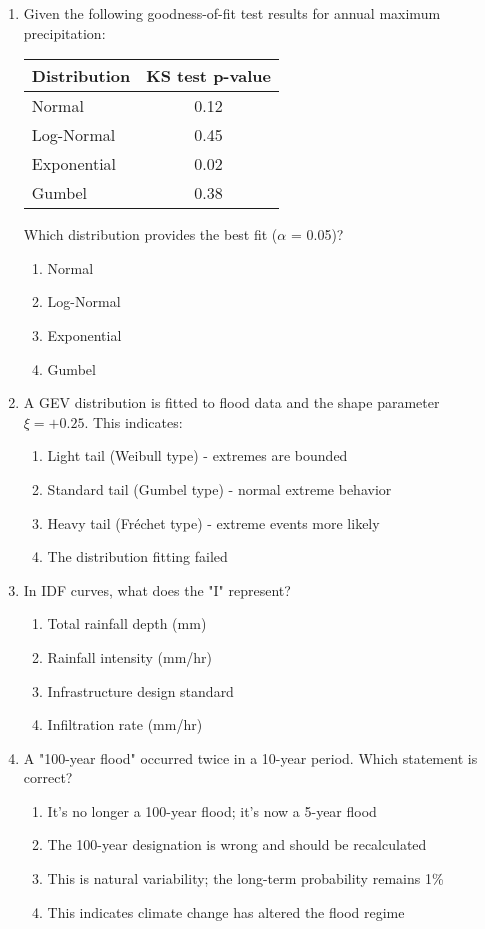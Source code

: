 \documentclass[11pt,a4paper]{article}
\begin{document}
\begin{enumerate}
\item Given the following goodness-of-fit test results for annual maximum precipitation:
\begin{center}
\begin{tabular}{lc}
Distribution & KS test p-value \\
\hline
Normal & 0.12 \\
Log-Normal & 0.45 \\
Exponential & 0.02 \\
Gumbel & 0.38 \\
\end{tabular}
\end{center}
Which distribution provides the best fit ($\alpha$ = 0.05)?
\begin{enumerate}[label=\Alph*)]
    \item Normal
    \item Log-Normal
    \item Exponential
    \item Gumbel
\end{enumerate}

\item A GEV distribution is fitted to flood data and the shape parameter $\xi = +0.25$. This indicates:
\begin{enumerate}[label=\Alph*)]
    \item Light tail (Weibull type) - extremes are bounded
    \item Standard tail (Gumbel type) - normal extreme behavior
    \item Heavy tail (Fréchet type) - extreme events more likely
    \item The distribution fitting failed
\end{enumerate}

\item In IDF curves, what does the "I" represent?
\begin{enumerate}[label=\Alph*)]
    \item Total rainfall depth (mm)
    \item Rainfall intensity (mm/hr)
    \item Infrastructure design standard
    \item Infiltration rate (mm/hr)
\end{enumerate}

\item A "100-year flood" occurred twice in a 10-year period. Which statement is correct?
\begin{enumerate}[label=\Alph*)]
    \item It's no longer a 100-year flood; it's now a 5-year flood
    \item The 100-year designation is wrong and should be recalculated
    \item This is natural variability; the long-term probability remains 1\%
    \item This indicates climate change has altered the flood regime
\end{enumerate}


\end{enumerate}
\end{document}
